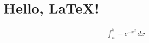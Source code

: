 \documentclass[a4paper]{article}
\begin{document}
\section{Hello, \LaTeX!}
\begin{align}
	\displaystyle\int_{a}^{b} -e^{-x^2} \, dx
\end{align}
\end{document}
